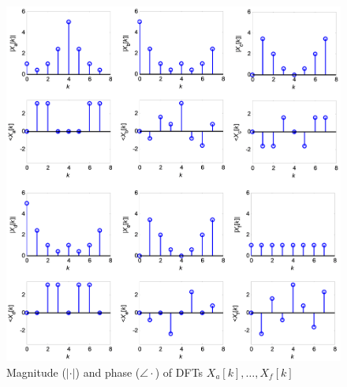 \documentclass[12pt]{report}
\begin{document}
\FloatBarrier
\begin{figure}[h!]
	\centering
	\includegraphics[width=\textwidth]{figs/dfts_mag.png}
	\caption{Magnitude ($|\cdot|$) and phase ($\angle \cdot$) of DFTs $X_a[k], \ldots, X_f[k]$}
	\label{fig:dfts}
\end{figure}
\FloatBarrier
 
~~~
 
\newpage
{} 
\end{document}
